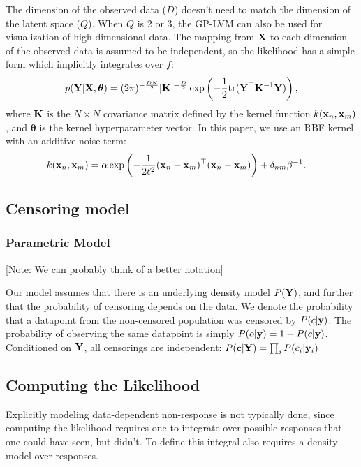 \documentclass{article}
\begin{document}
The dimension of the observed data ($D$) doesn't need to match the dimension of the latent space ($Q$).  When $Q$ is 2 or 3, the GP-LVM can also be used for visualization of high-dimensional data.  The mapping from $\mathbf{X}$ to each dimension of the observed data is assumed to be independent, so the likelihood has a simple form which implicitly integrates over $f$:
%
\begin{align}
p(\mathbf{Y} | \mathbf{X},\bm{\theta})  = (2 \pi)^{-\frac{DN}{2}}  |\mathbf{K}|^{-\frac{D}{2}} \exp \left( -\frac{1}{2} {\rm tr}( \mathbf{Y}^{\top} \mathbf{K}^{-1} \mathbf{Y}) \right),
\label{eq:py_x}
\end{align}
where $\mathbf{K}$ is the $N \times N$ covariance matrix defined 
by the kernel function $k({\bf{x}}_{n},{\bf{x}}_{m})$,
and $\bm{\theta}$ is the kernel hyperparameter vector.
In this paper, we use an RBF kernel with an additive noise term:
\begin{align}
k({\bf{x}}_{n},{\bf{x}}_{m}) &= \alpha \exp\left( - \frac{1}{2 \ell^2}({\bf{x}}_n - {\bf{x}}_m)^{\top} ({\bf{x}}_n - {\bf{x}}_m) \right) + \delta_{nm} \beta^{-1}.
\end{align}


\subsection{Censoring model}

\subsubsection{Parametric Model}

[Note: We can probably think of a better notation]

Our model assumes that there is an underlying density model $P(\mathbf{Y})$, and further that the probability of censoring depends on the data.  We denote the probability that a datapoint from the non-censored population was censored by $P(c| {\bf{y}})$.  The probability of observing the same datapoint is simply $P(o| {\bf{y}}) = 1 - P(c| {\bf{y}})$.  Conditioned on $\mathbf{Y}$, all censorings are independent:  $P({\bf{c}}| \mathbf{Y}) = \prod_i P(c_i| {\bf{y}}_i)$


\subsection{Computing the Likelihood}

Explicitly modeling data-dependent non-response is not typically done, since computing the likelihood requires one to integrate over possible responses that one could have seen, but didn't.  To define this integral also requires a density model over responses. 
\end{document}
